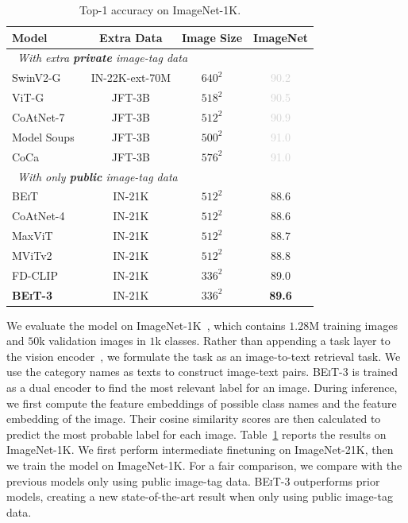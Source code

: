 \documentclass{article}
\newcommand\our{\textsc{BEiT-3}}
\newcommand\beit{\textsc{BEiT}}
\begin{document}
\begin{table}[t]
\centering
\begin{tabular}{@{}lccc@{}}
\toprule
\bf Model & \bf Extra Data & \bf Image Size & \bf ImageNet \\
\midrule
\multicolumn{4}{l}{~\textit{With extra \textbf{private} image-tag data}} \\
SwinV2-G~\citep{swinv2} & IN-22K-ext-70M & $640^2$ & \textcolor{lightgray}{90.2} \\
ViT-G~\citep{scaling:vit} & JFT-3B & $518^2$ & \textcolor{lightgray}{90.5} \\
CoAtNet-7~\citep{coatnet} & JFT-3B & $512^2$ & \textcolor{lightgray}{90.9} \\
Model Soups~\citep{modelsoups} & JFT-3B & $500^2$ & \textcolor{lightgray}{91.0} \\
CoCa~\citep{coca} & JFT-3B & $576^2$ & \textcolor{lightgray}{91.0} \\
\midrule
\multicolumn{4}{l}{~\textit{With only \textbf{public} image-tag data}} \\
\beit{}~\citep{beit} & IN-21K & $512^2$ & 88.6 \\
CoAtNet-4~\citep{coatnet} & IN-21K & $512^2$ & 88.6 \\
MaxViT~\citep{maxvit} & IN-21K & $512^2$ & 88.7 \\
MViTv2~\citep{mvitv2} & IN-21K & $512^2$ & 88.8 \\
FD-CLIP~\citep{fd-swin} & IN-21K & $336^2$ & 89.0 \\
\bf \our{} & IN-21K & $336^2$ & \bf 89.6 \\
\bottomrule
\end{tabular}
\caption{Top-1 accuracy on ImageNet-1K.
}
\label{tbl:results:in1k}
\end{table}


We evaluate the model on ImageNet-1K~\citep{imagenet}, which contains $1.28$M training images and $50$k validation images in $1$k classes.
Rather than appending a task layer to the vision encoder~\citep{vit,beit}, we formulate the task as an image-to-text retrieval task.
We use the category names as texts to construct image-text pairs.
\our{} is trained as a dual encoder to find the most relevant label for an image.
During inference, we first compute the feature embeddings of possible class names and the feature embedding of the image.
Their cosine similarity scores are then calculated to predict the most probable label for each image.
Table~\ref{tbl:results:in1k} reports the results on ImageNet-1K. 
We first perform intermediate finetuning on ImageNet-21K, then we train the model on ImageNet-1K.
For a fair comparison, we compare with the previous models only using public image-tag data.
\our{} outperforms prior models, creating a new state-of-the-art result when only using public image-tag data. 
\end{document}
